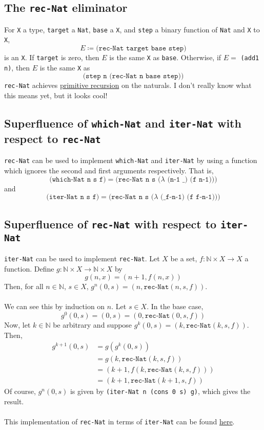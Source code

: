\documentclass{article}
\newcommand{\ttt}[1]{\texttt{#1}}
\newcommand{\bb}[1]{\mathbb{#1}}
\newcommand{\bN}{\bb{N}}
\begin{document}
\subsection{The \ttt{rec-Nat} eliminator} \label{rec-nat-elim}
For \ttt{X} a type, \ttt{target} a \ttt{Nat}, \ttt{base} a \ttt{X}, and \ttt{step} a binary function of \ttt{Nat} and \ttt{X} to \ttt{X}, \[ E \coloneqq \ttt{(rec-Nat target base step)} \] is an \ttt{X}. If \ttt{target} is zero, then \(E\) is the same \ttt{X} as \ttt{base}. Otherwise, if \(E = \) \ttt{(add1 n)}, then \(E\) is the same \ttt{X} as \[
    \ttt{(step n (rec-Nat n base step))}
\]
\ttt{rec-Nat} achieves \href{https://en.wikipedia.org/wiki/Primitive_recursive_function}{primitive recursion} on the naturals. I don't really know what this means yet, but it looks cool!
\subsection{Superfluence of \ttt{which-Nat} and \ttt{iter-Nat} with respect to \ttt{rec-Nat}}
\ttt{rec-Nat} can be used to implement \ttt{which-Nat} and \ttt{iter-Nat} by using a function which ignores the second and first arguments respectively. That is, \[
    \ttt{(which-Nat n s f)} = \ttt{(rec-Nat n s (\(\lambda\) (n-1 \_) (f n-1)))}
\]
and \[
    \ttt{(iter-Nat n s f)} = \ttt{(rec-Nat n s (\(\lambda\) (\_ f-n-1) (f f-n-1)))}
\]
\subsection{Superfluence of \ttt{rec-Nat} with respect to \ttt{iter-Nat}} \label{recNat-in-iterNat}
\ttt{iter-Nat} can be used to implement \ttt{rec-Nat}. Let \(X\) be a set, \(f : \mathbb{N} \times X \to X\) a function. Define \(g : \mathbb{N} \times X \to \mathbb{N} \times X\) by \[
    g(n, x) = (n + 1, f(n, x))
\]
Then, for all \(n \in \bN\), \(s \in X\), \(g^n(0, s) = (n, \ttt{rec-Nat}(n, s, f))\).
\\ \\
We can see this by induction on \(n\). Let \(s \in X\). In the base case, \[
    g^0(0, s) = (0, s) = (0, \ttt{rec-Nat}(0, s, f))
\]
Now, let \(k \in \bN\) be arbitrary and suppose \(g^k(0, s) = (k, \ttt{rec-Nat}(k, s, f))\). Then,
\begin{align*}
    g^{k + 1}(0, s) 
        &= g(g^k(0, s)) \\
        &= g(k, \ttt{rec-Nat}(k, s, f)) \\
        &= (k + 1, f(k, \ttt{rec-Nat}(k, s, f))) \\
        &= (k + 1, \ttt{rec-Nat}(k + 1, s, f))
\end{align*}
Of course, \(g^n(0, s)\) is given by \ttt{(iter-Nat n (cons 0 s) g)}, which gives the result.
\\ \\
This implementation of \ttt{rec-Nat} in terms of \ttt{iter-Nat} can be found \hyperref[code:rec-Nat2]{here}.
\end{document}
